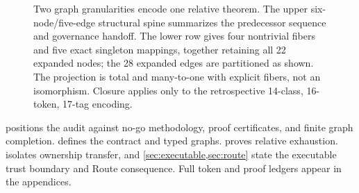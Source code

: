 \begin{figure}[t]
  \centering
  \resizebox{\textwidth}{!}{}
  \caption{Two graph granularities encode one relative theorem.  The upper
  six-node/five-edge structural spine summarizes the predecessor sequence and
  governance handoff.  The lower row gives four nontrivial fibers and five
  exact singleton mappings, together retaining all 22 expanded nodes; the 28
  expanded edges are partitioned as shown.  The projection is total and
  many-to-one with explicit fibers, not an isomorphism.  Closure applies only
  to the retrospective 14-class, 16-token, 17-tag encoding.}
  \label{fig:spine-expanded}
\end{figure}

 positions the audit against no-go methodology, proof
certificates, and finite graph completion.   defines the
contract and typed graphs.   proves relative exhaustion.
 isolates ownership transfer, and
\cref{sec:executable,sec:route} state the executable trust boundary and Route
consequence.  Full token and proof ledgers appear in the appendices.
